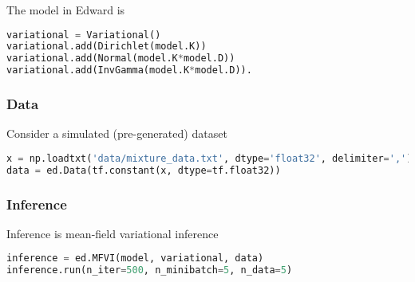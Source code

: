 The model in Edward is
\begin{lstlisting}[language=Python]
variational = Variational()
variational.add(Dirichlet(model.K))
variational.add(Normal(model.K*model.D))
variational.add(InvGamma(model.K*model.D)).
\end{lstlisting}


\subsubsection{Data}

Consider a simulated (pre-generated) dataset
\begin{lstlisting}[language=Python]
x = np.loadtxt('data/mixture_data.txt', dtype='float32', delimiter=',')
data = ed.Data(tf.constant(x, dtype=tf.float32))
\end{lstlisting}


\subsubsection{Inference}

Inference is mean-field variational inference
\begin{lstlisting}[language=Python]
inference = ed.MFVI(model, variational, data)
inference.run(n_iter=500, n_minibatch=5, n_data=5)
\end{lstlisting}
